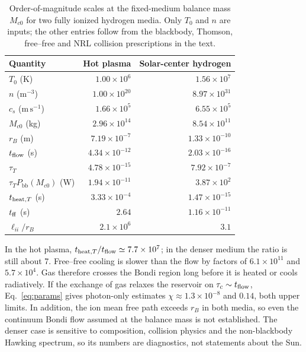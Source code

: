 \documentclass[11pt,a4paper]{article}
\newcommand{\Pbb}{P_{\mathrm{bb}}}
\newcommand{\Mc}{M_{c0}}
\begin{document}
\begin{table}[tbp]
\centering\small
\caption{Order-of-magnitude scales at the fixed-medium balance mass $\Mc$ for two fully ionized hydrogen media. Only $T_0$ and $n$ are inputs; the other entries follow from the blackbody, Thomson, free--free and NRL collision prescriptions in the text.}
\label{tab:plasma}
\begin{tabular}{@{}lrr@{}}
\toprule
Quantity & Hot plasma & Solar-center hydrogen\\
\midrule
$T_0$ (K) & $1.00\times10^{6}$ & $1.56\times10^{7}$\\
$n$ ($\mathrm{m^{-3}}$) & $1.00\times10^{20}$ & $8.97\times10^{31}$\\
$c_s$ ($\mathrm{m\,s^{-1}}$) & $1.66\times10^{5}$ & $6.55\times10^{5}$\\
$\Mc$ (kg) & $2.96\times10^{14}$ & $8.54\times10^{11}$\\
$r_B$ (m) & $7.19\times10^{-7}$ & $1.33\times10^{-10}$\\
$t_{\rm flow}$ (s) & $4.34\times10^{-12}$ & $2.03\times10^{-16}$\\
$\tau_T$ & $4.78\times10^{-15}$ & $7.92\times10^{-7}$\\
$\tau_T\Pbb(\Mc)$ (W) & $1.94\times10^{-11}$ & $3.87\times10^{2}$\\
$t_{{\rm heat},T}$ (s) & $3.33\times10^{-4}$ & $1.47\times10^{-15}$\\
$t_{\rm ff}$ (s) & $2.64$ & $1.16\times10^{-11}$\\
$\ell_{ii}/r_B$ & $2.1\times10^{6}$ & $3.1$\\
\bottomrule
\end{tabular}
\end{table}

In the hot plasma, $t_{{\rm heat},T}/t_{\rm flow}\simeq7.7\times10^7$; in the denser medium the ratio is still about 7. Free--free cooling is slower than the flow by factors of $6.1\times10^{11}$ and $5.7\times10^4$. Gas therefore crosses the Bondi region long before it is heated or cools radiatively. If the exchange of gas relaxes the reservoir on $\tau_c\sim t_{\rm flow}$, Eq.~\eqref{eq:params} gives photon-only estimates $\chi\approx1.3\times10^{-8}$ and $0.14$, both upper limits. In addition, the ion mean free path exceeds $r_B$ in both media, so even the continuum Bondi flow assumed at the balance mass is not established. The denser case is sensitive to composition, collision physics and the non-blackbody Hawking spectrum, so its numbers are diagnostics, not statements about the Sun.
\end{document}
